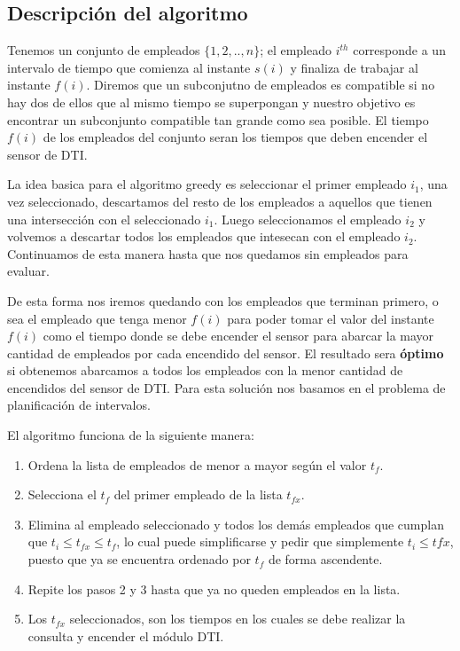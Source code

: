 \documentclass{article}
\begin{document}
\subsection{Descripción del algoritmo}

Tenemos un conjunto de empleados \(\{1,2,..,n\}\); el empleado \(i^{th}\) corresponde a un intervalo de tiempo que comienza al instante \(s(i)\) y finaliza de trabajar al instante \(f(i)\).
Diremos que un subconjutno de empleados es compatible si no hay dos de ellos que al mismo tiempo se superpongan y nuestro objetivo es encontrar un subconjunto compatible tan grande como sea posible.
El tiempo \(f(i)\) de los empleados del conjunto seran los tiempos que deben encender el sensor de DTI.

La idea basica para el algoritmo greedy es seleccionar el primer empleado \(i_1\), una vez seleccionado, descartamos del resto de los empleados a aquellos que tienen una intersección con el seleccionado \(i_1\).
Luego seleccionamos el empleado \(i_2\) y volvemos a descartar todos los empleados que intesecan con el empleado \(i_2\). Continuamos de esta manera hasta que nos quedamos sin empleados para evaluar.  

De esta forma nos iremos quedando con los empleados que terminan primero, o sea el empleado que tenga menor \(f(i)\) para poder tomar el valor del instante \(f(i)\) como el tiempo donde se debe encender el sensor para 
abarcar la mayor cantidad de empleados por cada encendido del sensor. El resultado sera \textbf{óptimo} si obtenemos abarcamos a todos los empleados con la menor cantidad de encendidos del sensor de DTI. Para esta solución nos basamos en el problema de planificación de intervalos.

El algoritmo funciona de la siguiente manera:
\begin{enumerate}
    \item Ordena la lista de empleados de menor a mayor según el valor \(t_f\).
    \item Selecciona el \(t_f\) del primer empleado de la lista \(t_{fx}\).
    \item Elimina al empleado seleccionado y todos los demás empleados que cumplan que \(t_i \leq t_{fx} \leq t_f\), lo cual puede simplificarse y pedir que simplemente \(t_i \leq tfx\), puesto que ya se encuentra ordenado por \(t_f\) de forma ascendente.
    \item Repite los pasos 2 y 3 hasta que ya no queden empleados en la lista.
    \item Los \(t_{fx}\) seleccionados, son los tiempos en los cuales se debe realizar la consulta y encender el módulo DTI.
\end{enumerate}
\end{document}
